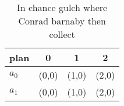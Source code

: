 \documentclass[a4paper]{article}
\begin{document}
\begin{table}
\begin{adjustbox}{width=0.6\columnwidth}
\begin{tabular}{|l|l|l|l|}
\hline
\textbf{plan} & \multicolumn{1}{c|}{\textbf{0}} & \multicolumn{1}{c|}{\textbf{1}} & \multicolumn{1}{c|}{\textbf{2}} \\ \hline
\textbf{$a_0$}  & (0,0) & (1,0) & (2,0) \\ \hline
\textbf{$a_1$}  & (0,0) & (1,0) & (2,0) \\ \hline
\end{tabular}
\end{adjustbox}
\caption{In chance gulch where Conrad barnaby then collect
}
\end{table}
\end{document}
